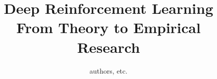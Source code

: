 \documentclass[graybox,envcountchap,sectrefs]{svmono}
\begin{document}
\author{authors, etc.}
\title{Deep Reinforcement Learning \\  From Theory to Empirical Research}
\subtitle{}
\maketitle

\frontmatter%

%
%

%

\tableofcontents




\mainmatter%
%
  
 
 
 
 
 
 
% 

%

\backmatter%

%
\printindex

\end{document}
